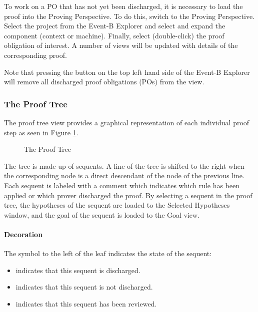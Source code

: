 To work on a PO that has not yet been discharged, it is necessary to load the proof into the Proving Perspective. To do this, switch to the Proving Perspective. Select the project from the Event-B Explorer and select and expand the component (context or machine). Finally, select (double-click) the proof obligation of interest. A number of views will be updated with details of the corresponding proof. 

Note that pressing the  button on the top left hand side of the \textsf{Event-B Explorer} will remove all discharged proof obligations (POs) from the view. 

\subsubsection{The Proof Tree}
\label{proof_tree_view}

The proof tree view provides a graphical representation of each individual proof step as seen in Figure \ref{fig_ref_01_proving_perspective2}.

\begin{figure}[!ht]
\begin{center}
	\caption{The Proof Tree}
	\label{fig_ref_01_proving_perspective2}
\end{center}
\end{figure}

The tree is made up of sequents. A line of the tree is shifted to the right when the corresponding node is a direct descendant of the node of the previous line. Each sequent is labeled with a comment which indicates which rule has been applied or which prover discharged the proof. By selecting a sequent in the proof tree, the hypotheses of the sequent are loaded to the \textsf{Selected Hypotheses window}, and the goal of the sequent is loaded to the \textsf{Goal view}.

\paragraph{Decoration}
The symbol to the left of the leaf indicates the state of the sequent:
\begin{itemize}
	\item {} indicates that this sequent is discharged.
	\item {} indicates that this sequent is not discharged.
	\item {} indicates that this sequent has been reviewed. 
\end{itemize}

